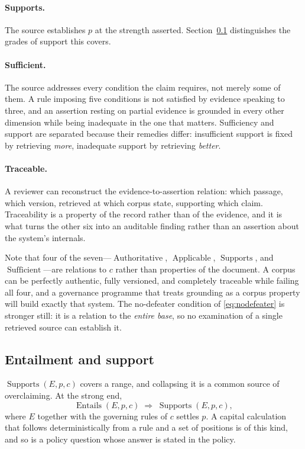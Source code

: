 \documentclass[11pt]{article}
\newcommand{\Supports}{\operatorname{Supports}}
\newcommand{\Applicable}{\operatorname{Applicable}}
\newcommand{\Authoritative}{\operatorname{Authoritative}}
\newcommand{\Entails}{\operatorname{Entails}}
\newcommand{\Sufficient}{\operatorname{Sufficient}}
\theoremstyle{plain}
\theoremstyle{definition}
\begin{document}
\paragraph{Supports.} The source establishes $p$ at the strength asserted.
Section~\ref{sec:entails-supports} distinguishes the grades of support this covers.

\paragraph{Sufficient.} The source addresses every condition the claim requires,
not merely some of them. A rule imposing five conditions is not satisfied by evidence
speaking to three, and an assertion resting on partial evidence is grounded in every
other dimension while being inadequate in the one that matters. Sufficiency and
support are separated because their remedies differ: insufficient support is fixed by
retrieving \emph{more}, inadequate support by retrieving \emph{better}.

\paragraph{Traceable.} A reviewer can reconstruct the evidence-to-assertion
relation: which passage, which version, retrieved at which corpus state, supporting
which claim. Traceability is a property of the record rather than of the evidence, and
it is what turns the other six into an auditable finding rather than an assertion
about the system's internals.

Note that four of the seven---$\Authoritative$, $\Applicable$, $\Supports$, and
$\Sufficient$---are relations to $c$ rather than properties of the document. A corpus
can be perfectly authentic, fully versioned, and completely traceable while failing
all four, and a governance programme that treats grounding as a corpus property will
build exactly that system. The no-defeater condition of \eqref{eq:nodefeater} is
stronger still: it is a relation to the \emph{entire base}, so no examination of a
single retrieved source can establish it.

\subsection{Entailment and support}
\label{sec:entails-supports}

$\Supports(E, p, c)$ covers a range, and collapsing it is a common source of
overclaiming. At the strong end,
\begin{equation}
  \Entails(E, p, c) \;\Rightarrow\; \Supports(E, p, c),
  \label{eq:entails}
\end{equation}
where $E$ together with the governing rules of $c$ settles $p$. A capital
calculation that follows deterministically from a rule and a set of positions is of
this kind, and so is a policy question whose answer is stated in the policy.
\end{document}
